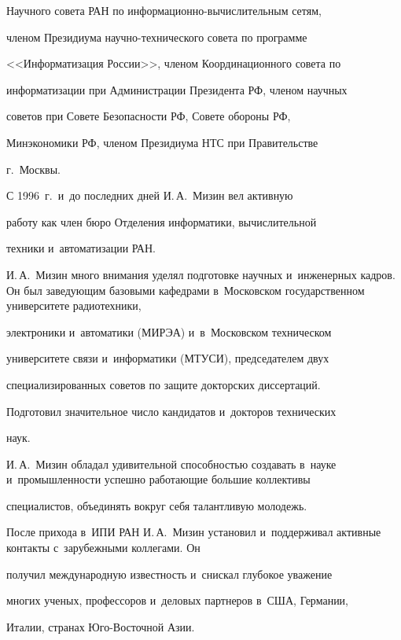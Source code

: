 Научного совета РАН по информационно-вычислительным сетям,


членом Президиума на\-уч\-но-тех\-ни\-че\-ско\-го совета по программе


<<Информатизация России>>, членом Координационного совета по


информатизации при Администрации Президента РФ, членом научных


советов при Совете Безопасности РФ, Совете обороны РФ,


Минэкономики РФ, членом Президиума НТС при Правительстве


г.~Москвы.





     С 1996~г.\ и~до последних дней И.\,А.~Мизин вел активную


работу как член бюро Отделения информатики, вычислительной


техники и~автоматизации РАН.





     И.\,А.~Мизин много внимания уделял подготовке научных и~инженерных кад\-ров. Он был заведующим базовыми кафедрами в~Московском государственном университете радиотехники,


электроники и~автоматики (МИРЭА) и~в~Московском техническом


университете связи и~информатики (МТУСИ), председателем двух


специализированных советов по защите докторских диссертаций.


Подготовил значительное число кандидатов и~докторов технических


наук.





     И.\,А.~Мизин обладал удивительной способностью создавать в~науке и~промышленности успешно работающие большие коллективы


специалистов, объединять вокруг себя талантливую молодежь.





     После прихода в~ИПИ РАН И.\,А.~Мизин установил и~поддерживал активные контакты с~зарубежными коллегами. Он


получил международную известность и~снискал глубокое уважение


многих ученых, профессоров и~деловых партнеров в~США, Германии,


Италии, странах Юго-Вос\-точ\-ной Азии.





